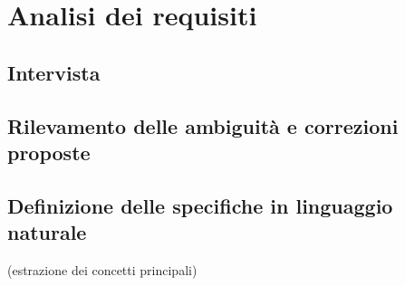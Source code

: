 \section{Analisi dei requisiti}
\subsection{Intervista}
\cite{GitHub}
\subsection{Rilevamento delle ambiguità e correzioni proposte}

\subsection{Definizione delle specifiche in linguaggio naturale}
(estrazione dei concetti principali)
